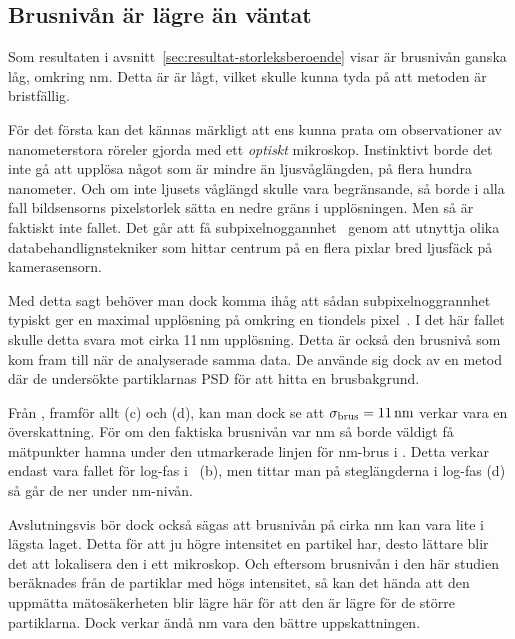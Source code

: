 
\subsection{Brusnivån är lägre än väntat}
Som resultaten i avsnitt~\ref{sec:resultat-storleksberoende} visar är brusnivån ganska låg, omkring \unit[5]{nm}. Detta är är lågt, vilket skulle kunna tyda på att metoden är bristfällig.

För det första kan det kännas märkligt att ens kunna prata om observationer av nanometerstora röreler gjorda med ett \emph{optiskt} mikroskop. Instinktivt borde det inte gå att upplösa något som är mindre än ljusvåglängden, på flera hundra nanometer. Och om inte ljusets våglängd skulle vara begränsande, så borde i alla fall bildsensorns pixelstorlek sätta en nedre gräns i upplösningen. Men så är faktiskt inte fallet. Det går att få subpixelnoggannhet~\cite{Saunter2010} genom att utnyttja olika databehandlignstekniker som hittar centrum på en flera pixlar bred ljusfäck på kamerasensorn.

Med detta sagt behöver man dock komma ihåg att sådan subpixelnoggrannhet typiskt ger en maximal upplösning på omkring en tiondels pixel~\cite{Saunter2010}. I det här fallet skulle detta svara mot cirka 11\,nm upplösning. Detta är också den brusnivå som \cite{Midtveldt_etal2016} kom fram till när de analyserade samma data. De använde sig dock av en metod där de undersökte partiklarnas PSD för att hitta en brusbakgrund. 


Från , framför allt (c) och (d), kan man dock se att $\sigma_\text{brus}=\unit[11]{nm}$ verkar vara en överskattning. För om den faktiska brusnivån var \unit[11]{nm} så borde väldigt få mätpunkter hamna under den utmarkerade linjen för \unit[11]{nm}-brus i . Detta verkar endast vara fallet för log-fas i ~(b), men tittar man på steglängderna i log-fas (d) så går de ner under \unit[11]{nm}-nivån.

Avslutningsvis bör dock också sägas att brusnivån på cirka \unit[5]{nm} kan vara lite i lägsta laget. Detta för att ju högre intensitet en partikel har, desto lättare blir det att lokalisera den i ett mikroskop. Och eftersom brusnivån i den här studien beräknades från de partiklar med högs intensitet, så kan det hända att den uppmätta mätosäkerheten blir lägre här för att den är lägre för de större partiklarna. Dock verkar ändå \unit[5]{nm} vara den bättre uppskattningen.





